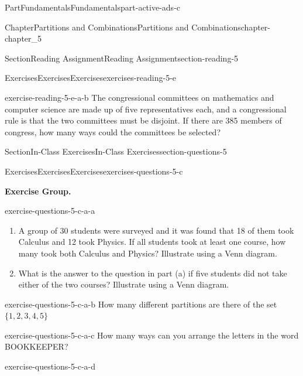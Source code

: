 \documentclass[oneside,10pt,]{book}
\numberwithin{equation}{section}
\begin{document}
\begin{partptx}{Part}{Fundamentals}{}{Fundamentals}{}{}{part-active-ads-c}
\begin{chapterptx}{Chapter}{Partitions and Combinations}{}{Partitions and Combinations}{}{}{chapter-chapter_5}
\begin{sectionptx}{Section}{Reading Assignment}{}{Reading Assignment}{}{}{section-reading-5}
\begin{exercises-subsection-numberless}{Exercises}{Exercises}{}{Exercises}{}{}{exercises-reading-5-e}
\begin{exercisegroup}
\begin{divisionexerciseeg}{2}{}{}{exercise-reading-5-e-a-b}
The congressional committees on mathematics and computer science are made up of five representatives each, and a congressional rule is that the two committees must be disjoint. If there are 385 members of congress, how many ways could the committees be selected?%
\end{divisionexerciseeg}%
\end{exercisegroup}
\par\medskip\noindent
\end{exercises-subsection-numberless}
\end{sectionptx}
%
%
\typeout{************************************************}
\typeout{************************************************}
%
\begin{sectionptx}{Section}{In-Class Exercises}{}{In-Class Exercises}{}{}{section-questions-5}
%
%
%
\typeout{************************************************}
\typeout{************************************************}
%
\begin{exercises-subsection-numberless}{Exercises}{Exercises}{}{Exercises}{}{}{exercises-questions-5-c}
\par\medskip\noindent%
\textbf{Exercise Group.}\space\space%
\begin{exercisegroup}
\begin{divisionexerciseeg}{1}{}{}{exercise-questions-5-c-a-a}%
%
\begin{enumerate}[label=(\alph*)]
\item{}A group of 30 students were surveyed and it was found that 18 of them took Calculus and 12 took Physics. If all students took at least one course, how many took both Calculus and Physics? Illustrate using a Venn diagram.%
\item{}What is the answer to the question in part (a) if five students did not take either of the two courses? Illustrate using a Venn diagram.%
\end{enumerate}
%
\end{divisionexerciseeg}%
\begin{divisionexerciseeg}{2}{}{}{exercise-questions-5-c-a-b}%
How many different partitions are there of the set \(\{1,2,3,4,5\}\)%
\end{divisionexerciseeg}%
\begin{divisionexerciseeg}{3}{}{}{exercise-questions-5-c-a-c}%
How many ways can you arrange the letters in the word BOOKKEEPER?%
\end{divisionexerciseeg}%
\begin{divisionexerciseeg}{4}{}{}{exercise-questions-5-c-a-d}%

\end{divisionexerciseeg}
\end{exercisegroup}
\end{exercises-subsection-numberless}
\end{sectionptx}
\end{chapterptx}
\end{partptx}
\end{document}

